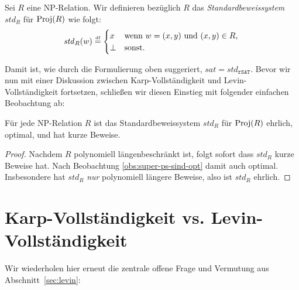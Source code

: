 \begin{definition}
    Sei $R$ eine NP-Relation. Wir definieren bezüglich $R$ das \emph{Standardbeweissystem} $\mathit{std}_R$ für $\operatorname{Proj}(R)$ wie folgt:
    \[ \mathit{std}_R(w) \stackrel{\text{\smash{\tiny df}}}{=} \begin{cases} x & \text{wenn $w=(x,y)$ und $(x,y)\in R$,}\\
    \bot & \text{sonst}.\end{cases} \qedhere \] 
\end{definition}
Damit ist, wie durch die Formulierung oben suggeriert, $\mathit{sat}=\mathit{std}_{\mathtt{rSAT}}$.
Bevor wir nun mit einer Diskussion zwischen Karp-Vollständigkeit und Levin-Vollständigkeit fortsetzen, schließen wir diesen Einstieg mit folgender einfachen Beobachtung ab:
\begin{observation}\label{obs:spps-honest}
    Für jede NP-Relation $R$ ist das Standardbeweissystem $\mathit{std}_R$ für $\operatorname{Proj}(R)$ ehrlich, optimal, und hat kurze Beweise.
\end{observation}
\begin{proof}
    Nachdem $R$ polynomiell längenbeschränkt ist, folgt sofort dass $\mathit{std}_R$ kurze Beweise hat. 
    Nach Beobachtung \ref{obs:super-ps-sind-opt} damit auch optimal.
    Insbesondere hat $\mathit{std}_R$ \emph{nur} polynomiell längere Beweise, also ist $\mathit{std}_R$ ehrlich.
\end{proof}

\section{Karp-Vollständigkeit vs. Levin-Vollständigkeit}\label{sec:karp-vs-levin}

Wir wiederholen hier erneut die zentrale offene Frage und Vermutung aus Abschnitt~\ref{sec:levin}:


